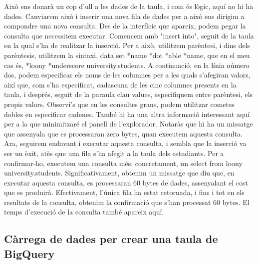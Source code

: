 \documentclass[12pt,longbibliography]{article}
\theoremstyle{definition}
\theoremstyle{remark}
\begin{document}
Això ens donarà un cop d'ull a les dades de la taula, i com és lògic, aquí no hi ha dades. Canviarem això i inserir una nova fila de dades per a això ens dirigim a compondre una nova consulta. Des de la interfície que apareix, podem pegar la consulta que necessitem executar. Comencem amb "insert into", seguit de la taula en la qual s'ha de realitzar la inserció. Per a això, utilitzem parèntesi, i dins dels parèntesis, utilitzem la sintaxi, data set *name *dot *able *name, que en el meu cas és, *loony *underscore university.students. A continuació, en la línia número dos, podem especificar els noms de les columnes per a les quals s'afegiran valors, així que, com s'ha especificat, cadascuna de les cinc columnes presents en la taula, i després, seguit de la paraula clau values, especifiquem entre parèntesi, els propis valors. Observi's que en les consultes grans, podem utilitzar cometes dobles en especificar cadenes. També hi ha una altra informació interessant aquí per a la que minimitzaré el panell de l'explorador. Notaràs que hi ha un missatge que assenyala que es processaran zero bytes, quan executem aquesta consulta. Ara, seguirem endavant i executar aquesta consulta, i sembla que la inserció va ser un èxit, atès que una fila s'ha afegit a la taula dels estudiants. Per a confirmar-ho, executem una consulta més, concretament, un select from loony university.students. Significativament, obtenim un missatge que diu que, en executar aquesta consulta, es processaran 60 bytes de dades, assenyalant el cost que es produirà. Efectivament, l'única fila ha estat retornada, i fins i tot en els resultats de la consulta, obtenim la confirmació que s'han processat 60 bytes. El temps d'execució de la consulta també apareix aquí.

\subsection{Càrrega de dades per crear una taula de BigQuery}
\end{document}
